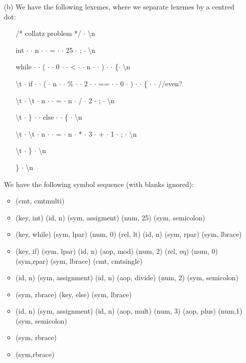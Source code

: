 \begin{solution}
\begin{enumerate}
  \item[(b)] We have the following lexemes, where we separate lexemes by a centred dot:
    \begin{itemize}
        \item[] /* collatz problem */ $\cdot$ \textbackslash{}n
        \item[] int $\cdot$ \textvisiblespace{} $\cdot$ n $\cdot$ \textvisiblespace{} $\cdot$ = $\cdot$ \textvisiblespace{} $\cdot$ 25 $\cdot$ ; $\cdot$ \textbackslash{}n
        \item[] while $\cdot$ \textvisiblespace{} $\cdot$ ( $\cdot$ \textvisiblespace{} $\cdot$ 0 $\cdot$ \textvisiblespace{} $\cdot$ < $\cdot$ \textvisiblespace{} $\cdot$ n $\cdot$ \textvisiblespace{} $\cdot$ ) $\cdot$ \textvisiblespace{} $\cdot$ \{$\cdot$ \textbackslash{}n
        \item[] \textbackslash{}t $\cdot$ if $\cdot$ \textvisiblespace{} $\cdot$ ( $\cdot$ n $\cdot$ \textvisiblespace{} $\cdot$ \% $\cdot$ \textvisiblespace{} $\cdot$ 2 $\cdot$ \textvisiblespace{} $\cdot$ == $\cdot$ \textvisiblespace{} $\cdot$ 0 $\cdot$ ) $\cdot$ \textvisiblespace{} $\cdot$ \{ $\cdot$ \textvisiblespace{} $\cdot$ //even?
        \item[] \textbackslash{}t $\cdot$ \textbackslash{}t $\cdot$ n $\cdot$ \textvisiblespace{} $\cdot$ = $\cdot$ n $\cdot$ / $\cdot$ 2 $\cdot$ ; $\cdot$ \textbackslash{}n
        \item[] \textbackslash{}t $\cdot$ \} $\cdot$ \textvisiblespace{} $\cdot$ else $\cdot$ \textvisiblespace{} $\cdot$ \{ $\cdot$ \textbackslash{}n
        \item[] \textbackslash{}t $\cdot$ \textbackslash{}t $\cdot$ n $\cdot$ \textvisiblespace{} $\cdot$ = $\cdot$ n $\cdot$ * $\cdot$ 3 $\cdot$ + $\cdot$ 1 $\cdot$ ; $\cdot$ \textbackslash{}n
        \item[] \textbackslash{}t $\cdot$ \} $\cdot$ \textbackslash{}n
        \item[] \} $\cdot$ \textbackslash{}n
    \end{itemize}

    We have the following symbol sequence (with blanks ignored):
    \begin{itemize}
        \item (cmt, cmtmulti)
        \item (key, int) (id, n) (sym, assigment) (num, 25) (sym, semicolon)
        \item (key, while) (sym, lpar) (num, 0) (rel, lt) (id, n) (sym, rpar) (sym, lbrace)
        \item (key, if) (sym, lpar) (id, n) (aop, mod) (num, 2) (rel, eq) (num, 0) (sym,rpar) (sym, lbrace) (cmt, cmtsingle)
        \item (id, n) (sym, assignment) (id, n) (aop, divide) (num, 2) (sym, semicolon)
 		\item (sym, rbrace) (key, else) (sym, lbrace)
 		\item (id, n) (sym, assignment) (id, n) (aop, mult) (num, 3) (aop, plus) (num,1) (sym, semicolon)
 		\item (sym, rbrace)
 		\item (sym,rbrace)
    \end{itemize}



\end{enumerate}
\end{solution}
